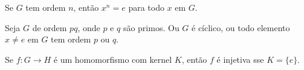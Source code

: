\begin{exercise}
	Se $G$ tem ordem $n$, então $x^n = e$ para todo $x$ em $G$.
\end{exercise}

\begin{exercise}
	Seja $G$ de ordem $pq$, onde $p$ e $q$ são primos. Ou $G$ é cíclico, ou todo elemento $x \neq e$ em $G$ tem ordem $p$ ou $q$.
\end{exercise}

\begin{exercise}
	Se $f:G \to H$ é um homomorfismo com kernel $K$, então $f$ é injetiva sse $K = \{e\}$.
\end{exercise}
